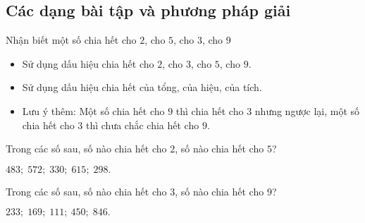 \subsection{Các dạng bài tập và phương pháp giải}
\begin{dang}{Nhận biết một số chia hết cho $2$, cho $5$, cho $3$, cho $9$}
\begin{itemize}
	\item Sử dụng dấu hiệu chia hết cho $2$, cho $3$, cho $5$, cho $9$.
	\item Sử dụng dấu hiệu chia hết của tổng, của hiệu, của tích.
	\item Lưu ý thêm: Một số chia hết cho $9$ thì chia hết cho $3$ nhưng ngược lại, một số chia hết cho $3$ thì chưa chắc chia hết cho $9$.
\end{itemize}
\end{dang}
\begin{vd}%
Trong các số sau, số nào chia hết cho $2$, số nào chia hết cho $5$?
\begin{center}
	$483;\; 572;\;330;\;615;\;298.$
\end{center}
\end{vd}
\begin{vd}%
	Trong các số sau, số nào chia hết cho $3$, số nào chia hết cho $9$? 
	\begin{center}
		$233;\; 169;\; 111;\ 450;\; 846.$
	\end{center}
\end{vd}
